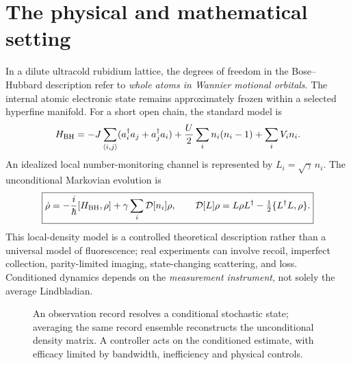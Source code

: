 \documentclass[11pt,a4paper]{article}
\begin{document}
\section{The physical and mathematical setting}
In a dilute ultracold rubidium lattice, the degrees of freedom in the Bose--Hubbard description refer to \emph{whole atoms in Wannier motional orbitals}. The internal atomic electronic state remains approximately frozen within a selected hyperfine manifold. For a short open chain, the standard model is
\begin{equation}\label{eq:bh}
H_{\rm BH}=-J\sum_{\langle i,j\rangle}(a_i^\dagger a_j+a_j^\dagger a_i)+\frac U2\sum_i n_i(n_i-1)+\sum_i V_i n_i.
\end{equation}
An idealized local number-monitoring channel is represented by $L_i=\sqrt\gamma\,n_i$. The unconditional Markovian evolution is
\begin{equation}\label{eq:lind}
\boxed{\dot\rho=-\frac{i}{\hbar}[H_{\rm BH},\rho]+\gamma\sum_i\mathcal D[n_i]\rho,\qquad \mathcal D[L]\rho=L\rho L^\dagger-\tfrac12\{L^\dagger L,\rho\}.}
\end{equation}
This local-density model is a controlled theoretical description rather than a universal model of fluorescence; real experiments can involve recoil, imperfect collection, parity-limited imaging, state-changing scattering, and loss. Conditioned dynamics depends on the \emph{measurement instrument}, not solely the average Lindbladian.
\begin{figure}[ht]\centering
{}
\caption{An observation record resolves a conditional stochastic state; averaging the same record ensemble reconstructs the unconditional density matrix. A controller acts on the conditioned estimate, with efficacy limited by bandwidth, inefficiency and physical controls.}
\end{figure}
\end{document}
